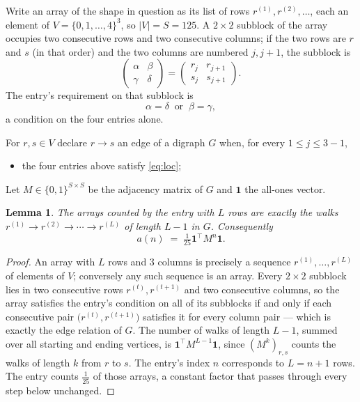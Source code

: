 \documentclass[11pt,a4paper]{article}
\theoremstyle{plain}
\newtheorem{lemma}[theorem]{Lemma}
\theoremstyle{definition}
\begin{document}
Write an array of the shape in question as its list of rows
$r^{(1)},r^{(2)},\dots$, each an element of
$V=\{0,1,\dots,4\}^{3}$, so $|V|=S=125$. A $2\times2$ subblock of the array
occupies two consecutive rows and two consecutive columns; if the two rows are $r$
and $s$ (in that order) and the two columns are numbered $j,j+1$,
the subblock is
\[
\begin{pmatrix}\alpha&\beta\\\gamma&\delta\end{pmatrix}=\begin{pmatrix}r_j&r_{j+1}\\s_j&s_{j+1}\end{pmatrix}.
\]
The entry's requirement on that subblock is
\begin{equation}\label{eq:loc}
\alpha=\delta\ \text{ or }\ \beta=\gamma,
\end{equation}
a condition on the four entries alone.

For $r,s\in V$ declare $r\to s$ an edge of a digraph $G$ when, for every
$1\le j\le 3-1$,
\begin{itemize}
\item the four entries above satisfy \eqref{eq:loc};

\end{itemize}
Let $M\in\{0,1\}^{S\times S}$ be the adjacency matrix of $G$ and $\mathbf{1}$ the
all-ones vector.

\begin{lemma}\label{lem:walk}
The arrays counted by the entry with $L$ rows are exactly the walks
$r^{(1)}\to r^{(2)}\to\cdots\to r^{(L)}$ of length $L-1$ in $G$. Consequently
\[
a(n)\;=\;\tfrac1{25}\mathbf{1}^{\!\top}M^{n}\mathbf{1} .
\]
\end{lemma}

\begin{proof}
An array with $L$ rows and $3$ columns is precisely a sequence
$r^{(1)},\dots,r^{(L)}$ of elements of $V$; conversely any such sequence is an array.
Every $2\times2$ subblock lies in two consecutive rows $r^{(t)},r^{(t+1)}$ and two
consecutive columns, so the array satisfies the entry's condition on all of its subblocks
if and only if each consecutive pair $\bigl(r^{(t)},r^{(t+1)}\bigr)$ satisfies it for
every column pair --- which is exactly the edge relation of $G$. The number of walks of
length $L-1$, summed over all starting and ending vertices, is
$\mathbf{1}^{\!\top}M^{L-1}\mathbf{1}$, since $(M^{k})_{r,s}$ counts the walks of
length $k$ from $r$ to $s$. The entry's index $n$ corresponds to $L=n+1$ rows. The entry counts $\tfrac1{25}$ of those arrays, a constant factor that passes through every step below unchanged.
\end{proof}
\end{document}
